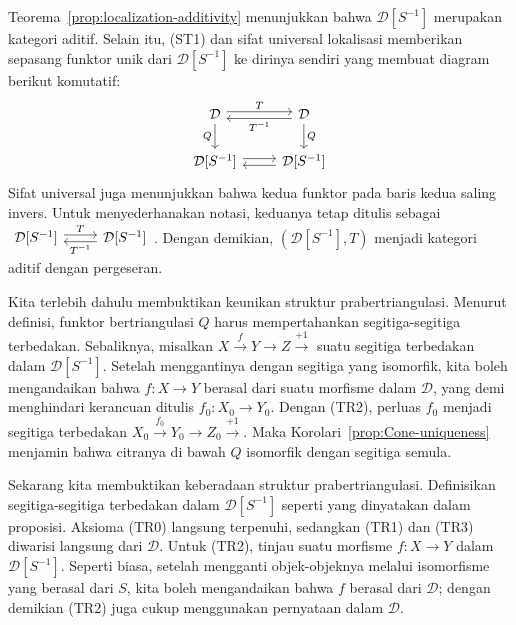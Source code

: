 \begin{bukti}
	Teorema~\ref{prop:localization-additivity} menunjukkan bahwa
	$\mathcal{D}[S^{-1}]$ merupakan kategori aditif. Selain itu, (ST1) dan sifat
	universal lokalisasi memberikan sepasang funktor unik dari
	$\mathcal{D}[S^{-1}]$ ke dirinya sendiri yang membuat diagram berikut
	komutatif:
	\[\begin{tikzcd}
		\mathcal{D} \arrow[r, "T", shift left] \arrow[d, "Q"'] & \mathcal{D} \arrow[l, "{T^{-1}}", shift left] \arrow[d, "Q"] \\
		\mathcal{D}[S^{-1}] \arrow[r, shift left] & \mathcal{D}[S^{-1}] \arrow[l, shift left]
	\end{tikzcd}\]
	Sifat universal juga menunjukkan bahwa kedua funktor pada baris kedua saling
	invers. Untuk menyederhanakan notasi, keduanya tetap ditulis sebagai
	$\begin{tikzcd}
		\mathcal{D}[S^{-1}] \arrow[r, "T", shift left] & \mathcal{D}[S^{-1}] \arrow[l, "{T^{-1}}", shift left]
	\end{tikzcd}$.
	Dengan demikian, $(\mathcal{D}[S^{-1}], T)$ menjadi kategori aditif dengan
	pergeseran.
	
	Kita terlebih dahulu membuktikan keunikan struktur prabertriangulasi.
	Menurut definisi, funktor bertriangulasi $Q$ harus mempertahankan
	segitiga-segitiga terbedakan. Sebaliknya, misalkan
	$X \xrightarrow{f} Y \to Z \xrightarrow{+1}$ suatu segitiga terbedakan dalam
	$\mathcal{D}[S^{-1}]$. Setelah menggantinya dengan segitiga yang isomorfik, kita boleh
	mengandaikan bahwa $f: X \to Y$ berasal dari suatu morfisme dalam
	$\mathcal{D}$, yang demi menghindari kerancuan ditulis
	$f_0: X_0 \to Y_0$. Dengan (TR2), perluas $f_0$ menjadi segitiga terbedakan
	$X_0 \xrightarrow{f_0} Y_0 \to Z_0 \xrightarrow{+1}$. Maka
	Korolari~\ref{prop:Cone-uniqueness} menjamin bahwa citranya di bawah $Q$
	isomorfik dengan segitiga semula.
	
	Sekarang kita membuktikan keberadaan struktur prabertriangulasi. Definisikan
	segitiga-segitiga terbedakan dalam $\mathcal{D}[S^{-1}]$ seperti yang
	dinyatakan dalam proposisi. Aksioma (TR0) langsung terpenuhi, sedangkan (TR1)
	dan (TR3) diwarisi langsung dari $\mathcal{D}$. Untuk (TR2), tinjau suatu
	morfisme $f: X \to Y$ dalam $\mathcal{D}[S^{-1}]$. Seperti biasa, setelah
	mengganti objek-objeknya melalui isomorfisme yang berasal dari $S$, kita boleh
	mengandaikan bahwa $f$ berasal dari $\mathcal{D}$; dengan demikian (TR2) juga
	cukup menggunakan pernyataan dalam $\mathcal{D}$.
	

\end{bukti}
